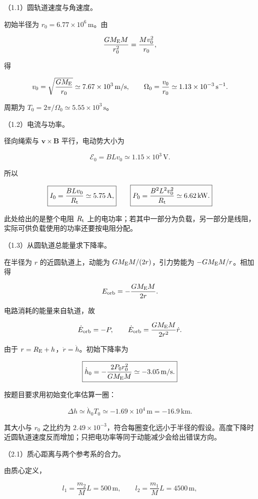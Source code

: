 \documentclass[12pt,a4paper,fontset=fandol]{ctexart}
\begin{document}
（1.1）圆轨道速度与角速度。

初始半径为 \(r_0=6.77\times10^6\,\mathrm m\)。由

\[
\frac{GM_{\rm E}M}{r_0^2}=\frac{Mv_0^2}{r_0},
\]

得

\[
v_0=\sqrt{\frac{GM_{\rm E}}{r_0}}
\simeq7.67\times10^3\,\mathrm{m/s},\qquad
\Omega_0=\frac{v_0}{r_0}
\simeq1.13\times10^{-3}\,\mathrm{s^{-1}}.
\]

周期为 \(T_0=2\pi/\Omega_0\simeq5.55\times10^3\,\mathrm s\)。

（1.2）电流与功率。

径向绳索与 \(\boldsymbol v\times\boldsymbol B\) 平行，电动势大小为

\[
\mathcal E_0=BLv_0\simeq1.15\times10^3\,\mathrm V.
\]

所以

\[
\boxed{I_0=\frac{BLv_0}{R_{\rm t}}\simeq5.75\,\mathrm A,}
\qquad
\boxed{P_0=\frac{B^2L^2v_0^2}{R_{\rm t}}\simeq6.62\,\mathrm{kW}.}
\]

此处给出的是整个电阻 \(R_{\rm t}\)
上的电功率；若其中一部分为负载，另一部分是线阻，实际可供负载使用的功率还要按电阻分配。

（1.3）从圆轨道总能量求下降率。

在半径为 \(r\) 的近圆轨道上，动能为 \(GM_{\rm E}M/(2r)\)，引力势能为
\(-GM_{\rm E}M/r\)。相加得

\[
E_{\rm orb}=-\frac{GM_{\rm E}M}{2r}.
\]

电路消耗的能量来自轨道，故

\[
\dot E_{\rm orb}=-P,\qquad
\dot E_{\rm orb}=\frac{GM_{\rm E}M}{2r^2}\dot r.
\]

由于 \(r=R_{\rm E}+h\)，\(\dot r=\dot h\)。初始下降率为

\[
\boxed{\dot h_0=-\frac{2P_0r_0^2}{GM_{\rm E}M}
\simeq-3.05\,\mathrm{m/s}.}
\]

按题目要求用初始变化率估算一圈：

\[
\boxed{\Delta h\simeq\dot h_0T_0\simeq-1.69\times10^4\,\mathrm m
=-16.9\,\mathrm{km}.}
\]

其大小与 \(r_0\) 之比约为
\(2.49\times10^{-3}\)，符合每圈变化远小于半径的假设。高度下降时近圆轨道速度反而增加；只把电功率等同于动能减少会给出错误方向。

（2.1）质心距离与两个参考系的合力。

由质心定义，

\[
l_1=\frac{m_2}{M}L=500\,\mathrm m,\qquad
l_2=\frac{m_1}{M}L=4500\,\mathrm m,
\]
\end{document}
